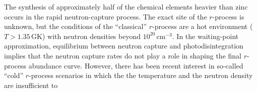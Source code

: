 {The synthesis of approximately half of the chemical elements heavier than zinc %
 occurs in the rapid neutron-capture process.
The exact site of the $r$-process is unknown, but the conditions of 
the ``classical'' $r$-process %
are a hot environment ($T> 1.35$\,GK) with neutron densities beyond %
$10^{20}$\,cm$^{-3}$. %
In the waiting-point approximation, equilibrium %
 between neutron capture and photodisintegration %
implies that  the neutron capture rates do not play a role %
in shaping the final $r$-process abundance curve.
However, there has been recent interest in so-called
 ``cold'' $r$-process scenarios in which the 
the temperature and the neutron density 
are insufficient to
}
